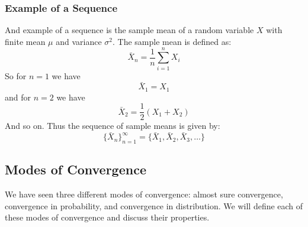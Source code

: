 \documentclass{article}
\theoremstyle{definition}
\theoremstyle{remark}
\begin{document}
\subsubsection{Example of a Sequence}
And example of a sequence is the sample mean of a random variable $X$ with finite mean $\mu$ and variance $\sigma^2$. The sample mean is defined as:
\begin{equation}
    \bar{X}_n = \dfrac{1}{n} \sum_{i=1}^{n} X_i
\end{equation}
So for $n = 1$ we have
\begin{equation}
    \bar{X}_1 = X_1
\end{equation}
and for $n = 2$ we have
\begin{equation}
    \bar{X}_2 = \dfrac{1}{2} (X_1 + X_2)
\end{equation}
And so on. Thus the sequence of sample means is given by:
\begin{equation}
    \{\bar{X}_n\}_{n=1}^{\infty} = \{\bar{X}_1, \bar{X}_2, \bar{X}_3, \ldots\}
\end{equation}

\subsection{Modes of Convergence}
We have seen three different modes of convergence: almost sure convergence, convergence in probability, and convergence in distribution. We will define each of these modes of convergence and discuss their properties.
\end{document}
